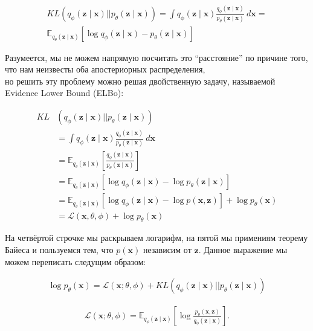 \documentclass{article}
\begin{document}
\begin{gather*}
    KL(q_\phi(\mathbf{z} \mid \mathbf{x}) || p_\theta(\mathbf{z} \mid \mathbf{x})) 
    = \int q_\phi(\mathbf{z} \mid \mathbf{x}) \frac{q_\phi(\mathbf{z} \mid \mathbf{x})}{p_\theta(\mathbf{z} \mid \mathbf{x})}~d\mathbf{x} =\\
    \mathbb{E}_{q_\theta(\mathbf{z} \mid \mathbf{x})} \left[\log q_\phi(\mathbf{z} \mid \mathbf{x}) - p_\theta(\mathbf{z} \mid \mathbf{x})\right]
\end{gather*}

Разумеется, мы не можем напрямую посчитать это ``расстояние'' по причине того, что нам неизвесты оба апостериорных распределения, \\
но решить эту проблему можно решая двойственную задачу, называемой Evidence Lower Bound (ELBo):

\begin{align*}
     KL&(q_\phi(\mathbf{z} \mid \mathbf{x}) || p_\theta(\mathbf{z} \mid \mathbf{x})) \\
    &= \int q_\phi(\mathbf{z} \mid \mathbf{x}) \frac{q_\phi(\mathbf{z} \mid \mathbf{x})}{p_\theta(\mathbf{z} \mid \mathbf{x})}~d\mathbf{x}\\
    &= \mathbb{E}_{q_\theta(\mathbf{z} \mid \mathbf{x})} \left[\frac{q_\phi(\mathbf{z} \mid \mathbf{x})}{p_\theta(\mathbf{z} \mid \mathbf{x})}\right]\\
    &= \mathbb{E}_{q_\theta(\mathbf{z} \mid \mathbf{x})} \left[\log q_\phi(\mathbf{z} \mid \mathbf{x}) - \log p_\theta(\mathbf{z} \mid \mathbf{x})\right]\\
    &= \mathbb{E}_{q_\theta(\mathbf{z} \mid \mathbf{x})} \left[\log q_\phi(\mathbf{z} \mid \mathbf{x}) - \log p(\mathbf{x}, \mathbf{z})\right] + \log p_\theta(\mathbf{x})\\
    &= \mathcal{L}(\mathbf{x}, \theta, \phi) + \log p_\theta(\mathbf{x})
\end{align*}

На четвёртой строчке мы раскрываем логарифм, на пятой мы примениям теорему Байеса и пользуемся тем, что $p(\mathbf{x})$ независим от $\mathbf{z}$. Данное
выражение мы можем переписать следущим образом:

\begin{align*}
  \log p_\theta(\mathbf{x}) = \mathcal{L} (\mathbf{x}; \theta, \phi) + KL \left( q_\phi (\mathbf{z} \mid \mathbf{x}) || p_\theta(\mathbf{z} \mid \mathbf{x}) \right)
\end{align*}

\begin{align*}
  \mathcal{L} (\mathbf{x}; \theta, \phi) = \mathbb{E}_{q_\phi (\mathbf{z} \mid \mathbf{x})}
    \left[
      \log \frac{
        p_\theta (\mathbf{x}, \mathbf{z})
      }{
        q_\phi (\mathbf{z} \mid \mathbf{x})
      }
    \right].
\end{align*}
\end{document}
